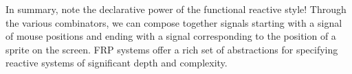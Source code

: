 In summary, note the declarative power of the functional reactive style!
Through the various combinators, we can compose together signals starting with a signal of mouse positions and ending with a signal corresponding to the position of a sprite on the screen.
FRP systems offer a rich set of abstractions for specifying reactive systems of significant depth and complexity.


